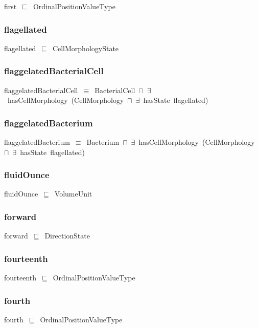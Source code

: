 \documentclass{article}
\begin{document}
first~\ensuremath{\sqsubseteq}~OrdinalPositionValueType~

\subsubsection*{flagellated}

flagellated~\ensuremath{\sqsubseteq}~CellMorphologyState~

\subsubsection*{flaggelatedBacterialCell}

flaggelatedBacterialCell~\ensuremath{\equiv}~BacterialCell~\ensuremath{\sqcap}~\ensuremath{\exists}~hasCellMorphology~(CellMorphology~\ensuremath{\sqcap}~\ensuremath{\exists}~hasState~flagellated)

\subsubsection*{flaggelatedBacterium}

flaggelatedBacterium~\ensuremath{\equiv}~Bacterium~\ensuremath{\sqcap}~\ensuremath{\exists}~hasCellMorphology~(CellMorphology~\ensuremath{\sqcap}~\ensuremath{\exists}~hasState~flagellated)

\subsubsection*{fluidOunce}

fluidOunce~\ensuremath{\sqsubseteq}~VolumeUnit~

\subsubsection*{forward}

forward~\ensuremath{\sqsubseteq}~DirectionState~

\subsubsection*{fourteenth}

fourteenth~\ensuremath{\sqsubseteq}~OrdinalPositionValueType~

\subsubsection*{fourth}

fourth~\ensuremath{\sqsubseteq}~OrdinalPositionValueType~
\end{document}
